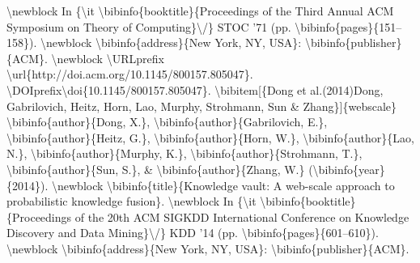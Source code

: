 \documentclass{article}%
\begin{document}
\textbackslash{}newblock In \{\textbackslash{}it \textbackslash{}bibinfo\{booktitle\}\{Proceedings of the Third Annual ACM\newline%
Symposium on Theory of Computing\}\textbackslash{}/\} STOC '71 (pp.\newline%
\textbackslash{}bibinfo\{pages\}\{151–158\}).\newline%
\textbackslash{}newblock \textbackslash{}bibinfo\{address\}\{New York, NY, USA\}: \textbackslash{}bibinfo\{publisher\}\{ACM\}.\newline%
\textbackslash{}newblock \textbackslash{}URLprefix \textbackslash{}url\{http://doi.acm.org/10.1145/800157.805047\}.\newline%
\textbackslash{}DOIprefix\textbackslash{}doi\{10.1145/800157.805047\}.\newline%
\textbackslash{}bibitem{[}\{Dong et al.(2014)Dong, Gabrilovich, Heitz, Horn, Lao, Murphy,\newline%
Strohmann, Sun \& Zhang\}{]}\{webscale\}\newline%
\textbackslash{}bibinfo\{author\}\{Dong, X.\}, \textbackslash{}bibinfo\{author\}\{Gabrilovich, E.\},\newline%
\textbackslash{}bibinfo\{author\}\{Heitz, G.\}, \textbackslash{}bibinfo\{author\}\{Horn, W.\},\newline%
\textbackslash{}bibinfo\{author\}\{Lao, N.\}, \textbackslash{}bibinfo\{author\}\{Murphy, K.\},\newline%
\textbackslash{}bibinfo\{author\}\{Strohmann, T.\}, \textbackslash{}bibinfo\{author\}\{Sun, S.\}, \&\newline%
\textbackslash{}bibinfo\{author\}\{Zhang, W.\} (\textbackslash{}bibinfo\{year\}\{2014\}).\newline%
\textbackslash{}newblock \textbackslash{}bibinfo\{title\}\{Knowledge vault: A web{-}scale approach to\newline%
probabilistic knowledge fusion\}.\newline%
\textbackslash{}newblock In \{\textbackslash{}it \textbackslash{}bibinfo\{booktitle\}\{Proceedings of the 20th ACM SIGKDD\newline%
International Conference on Knowledge Discovery and Data Mining\}\textbackslash{}/\} KDD '14\newline%
(pp. \textbackslash{}bibinfo\{pages\}\{601–610\}).\newline%
\textbackslash{}newblock \textbackslash{}bibinfo\{address\}\{New York, NY, USA\}: \textbackslash{}bibinfo\{publisher\}\{ACM\}.\newline%
\end{document}
